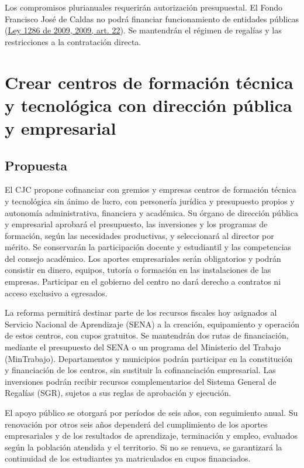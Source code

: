 Los compromisos plurianuales requerirán autorización presupuestal. El Fondo Francisco José de Caldas no podrá financiar funcionamiento de entidades públicas (\href{https://normativa.colpensiones.gov.co/compilacion/docs/ley\_1286\_2009.htm}{Ley 1286 de 2009, 2009, art. 22}). Se mantendrán el régimen de regalías y las restricciones a la contratación directa.

\section{Crear centros de formación técnica y tecnológica con dirección pública y empresarial}
\label{prop:12}

\subsection{Propuesta}

El CJC propone cofinanciar con gremios y empresas centros de formación técnica y tecnológica sin ánimo de lucro, con personería jurídica y presupuesto propios y autonomía administrativa, financiera y académica. Su órgano de dirección pública y empresarial aprobará el presupuesto, las inversiones y los programas de formación, según las necesidades productivas, y seleccionará al director por mérito. Se conservarán la participación docente y estudiantil y las competencias del consejo académico. Los aportes empresariales serán obligatorios y podrán consistir en dinero, equipos, tutoría o formación en las instalaciones de las empresas. Participar en el gobierno del centro no dará derecho a contratos ni acceso exclusivo a egresados.

La reforma permitirá destinar parte de los recursos fiscales hoy asignados al Servicio Nacional de Aprendizaje (SENA) a la creación, equipamiento y operación de estos centros, con cupos gratuitos. Se mantendrán dos rutas de financiación, mediante el presupuesto del SENA o un programa del Ministerio del Trabajo (MinTrabajo). Departamentos y municipios podrán participar en la constitución y financiación de los centros, sin sustituir la cofinanciación empresarial. Las inversiones podrán recibir recursos complementarios del Sistema General de Regalías (SGR), sujetos a sus reglas de aprobación y ejecución.

El apoyo público se otorgará por períodos de seis años, con seguimiento anual. Su renovación por otros seis años dependerá del cumplimiento de los aportes empresariales y de los resultados de aprendizaje, terminación y empleo, evaluados según la población atendida y el territorio. Si no se renueva, se garantizará la continuidad de los estudiantes ya matriculados en cupos financiados.

